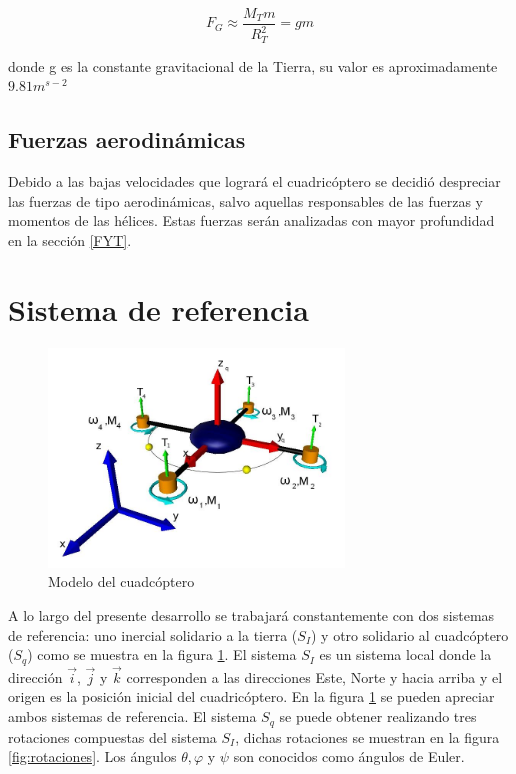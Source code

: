 \documentclass[main]{subfiles}
\begin{document}
\begin{equation}
F_G\approx\frac{M_Tm}{R_T^2}=gm
\end{equation}

donde g es la constante gravitacional de la Tierra, su valor es aproximadamente $9.81m^{s-2}$

\subsection{Fuerzas aerodin\'amicas}
Debido a las bajas velocidades que lograr\'a el cuadric\'optero se decidi\'o despreciar las fuerzas de tipo aerodin\'amicas, salvo aquellas responsables de las fuerzas y momentos de las h\'elices. Estas fuerzas ser\'an analizadas con mayor profundidad en la secci\'on \ref{FYT}.
\section{Sistema de referencia}

\begin{figure}
	\centering
	\includegraphics[width=0.7\textwidth]{./pics_modelo_fisico/quad_coord.jpg}
	\caption{Modelo del cuadc\'optero	}
	\label{fig:quad}
\end{figure}

A lo largo del presente desarrollo se trabajar\'a constantemente con dos sistemas de referencia: uno inercial solidario a la tierra ($S_I$) y otro solidario al cuadc\'optero ($S_q$) como se muestra en la figura \ref{fig:quad}. El sistema $S_I$ es un sistema local donde la direcci\'on $\vec{i}$, $\vec{j}$ y $\vec{k}$ corresponden a las direcciones Este, Norte y hacia arriba y el origen es la posici\'on inicial del cuadric\'optero. En la figura \ref{fig:quad} se pueden apreciar ambos sistemas de referencia.
El sistema $S_q$ se puede obtener realizando tres rotaciones compuestas del sistema $S_I$, dichas rotaciones se muestran en la figura \ref{fig:rotaciones}. Los \'angulos $\theta, \varphi$ y $\psi$ son conocidos como \'angulos de Euler.
\end{document}
